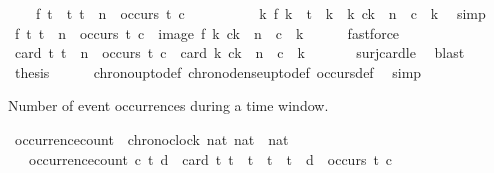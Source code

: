 \begin{isabellebody}
\isanewline
\ \ \ \ {\isacartoucheopen}{\isasymexists}f{\isachardot}\ {\isasymforall}t\ {\isasymin}\ {\isacharbraceleft}t{\isachardot}\ t\ {\isasymle}\ n\ {\isasymand}\ occurs\ t\ c{\isacharbraceright}{\isachardot}\isanewline
\ \ \ \ \ \ \ \ \ \ {\isasymexists}k{\isachardot}\ f\ k\ {\isacharequal}\ t\ {\isasymand}\ k\ {\isasymin}\ {\isacharbraceleft}k{\isachardot}\ c\isactrlbsub k\isactrlesub \ {\isasymle}\ n\ {\isasymand}\ c\ {\isasymnabla}\ k{\isacharbraceright}{\isacartoucheclose}\ \isamarkupfalse%
\ simp\isanewline
\ \ \isamarkupfalse%
\ {\isacartoucheopen}{\isasymexists}f{\isachardot}\ {\isacharbraceleft}t{\isachardot}\ t\ {\isasymle}\ n\ {\isasymand}\ occurs\ t\ c{\isacharbraceright}\ {\isasymsubseteq}\ image\ f\ {\isacharbraceleft}k{\isachardot}\ c\isactrlbsub k\isactrlesub \ {\isasymle}\ n\ {\isasymand}\ c\ {\isasymnabla}\ k{\isacharbraceright}{\isacartoucheclose}\isanewline
\ \ \ \ \isamarkupfalse%
\ fastforce\isanewline
\ \ \isamarkupfalse%
\ \isamarkupfalse%
\ {\isacartoucheopen}card\ {\isacharbraceleft}t{\isachardot}\ t\ {\isasymle}\ n\ {\isasymand}\ occurs\ t\ c{\isacharbraceright}\ {\isasymle}\ card\ {\isacharbraceleft}k{\isachardot}\ c\isactrlbsub k\isactrlesub \ {\isasymle}\ n\ {\isasymand}\ c\ {\isasymnabla}\ k{\isacharbraceright}{\isacartoucheclose}\isanewline
\ \ \ \ \isamarkupfalse%
\ \ surj{\isacharunderscore}card{\isacharunderscore}le\ \isamarkupfalse%
\ blast\isanewline
\ \ \isamarkupfalse%
\ {\isacharquery}thesis\isanewline
\ \ \ \ \isamarkupfalse%
\ chrono{\isacharunderscore}up{\isacharunderscore}to{\isacharunderscore}def\ chrono{\isacharunderscore}dense{\isacharunderscore}up{\isacharunderscore}to{\isacharunderscore}def\ occurs{\isacharunderscore}def\ \isamarkupfalse%
\ simp\isanewline
{}\isamarkupfalse%
%
\endisatagproof
{\isafoldproof}%
%
\isadelimproof
%
\endisadelimproof
%
\begin{isamarkuptext}%
Number of event occurrences during a time window.%
\end{isamarkuptext}\isamarkuptrue%
\isamarkupfalse%
\ occurrence{\isacharunderscore}count\ {\isacharcolon}{\isacharcolon}\ {\isacartoucheopen}{\isacharbrackleft}chronoclock{\isacharcomma}\ nat{\isacharcomma}\ nat{\isacharbrackright}\ {\isasymRightarrow}\ nat{\isacartoucheclose}\isanewline
\ \ \ {\isacartoucheopen}occurrence{\isacharunderscore}count\ c\ t\ d\ {\isasymequiv}\ card\ {\isacharbraceleft}t{\isachardot}\ t\ {\isasymle}\ t\ {\isasymand}\ t\ {\isacharless}\ t\ {\isacharplus}\ d\ {\isasymand}\ occurs\ t\ c{\isacharbraceright}{\isacartoucheclose}%

\end{isabellebody}
